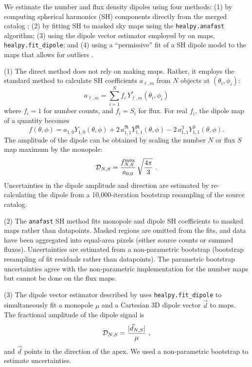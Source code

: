 \documentclass[twocolumn]{aastex63}
\begin{document}
We estimate the number and flux density dipoles using four methods:
(1) by computing spherical harmonics (SH) components directly from the merged catalog \citep[after][]{blake2002};
(2) by fitting SH to masked sky maps using the \texttt{healpy.anafast} algorithm;
(3) using the dipole vector estimator employed by \citet{secrest2021} on maps, \texttt{healpy.fit\_dipole}; and
(4) using a ``permissive'' fit of a SH dipole model to the maps that allows for outliers \citep{sivia2006,darling2018}.


(1) The direct method does not rely on making maps.  Rather, it employs the standard method to
calculate SH coefficients $a_{\ell,m}$ from $N$ objects at $(\theta_i,\phi_i)$:
\begin{equation}
  a_{\ell,m} = \sum_{i=1}^N f_i\, Y^*_{\ell,m}(\theta_i,\phi_i)
\end{equation}
where $f_i = 1$ for number counts, and $f_i = S_i$ for flux.  For real $f_i$, the dipole map of
a quantity becomes
\begin{equation}
  f(\theta,\phi) =   a_{1,0} Y_{1,0}(\theta,\phi) +2\, a_{1,1}^\Re Y_{1,1}^\Re(\theta,\phi)
                                                                       -2\, a_{1,1}^\Im Y_{1,1}^\Im(\theta,\phi).
\end{equation}
The amplitude of the dipole can be obtained by scaling the number $N$ or flux $S$ map maximum by the monopole:
\begin{equation}
  \mathcal{D}_{N,S} = {f_{N,S}^{\rm max} \over a_{0,0}}\, \sqrt{4\pi\over3}\ .
\end{equation}
Uncertainties in the dipole amplitude and direction are estimated by
re-calculating the dipole from a 10,000-iteration bootstrap resampling of the source catalog.


(2) The \texttt{anafast} SH method fits monopole and dipole SH coefficients to masked maps rather
than datapoints.  Masked regions are omitted from the fits, and data have been aggregated into equal-area
pixels (either source counts or summed fluxes).  Uncertainties are estimated from a non-parametric bootstrap (bootstrap
resampling of fit residuals rather than datapoints).
The parametric bootstrap uncertainties agree with the non-parametric implementation for the number maps but cannot
be done on the flux maps.

(3) The dipole vector estimator described by \citet{secrest2021} uses \texttt{healpy.fit\_dipole} to
simultaneously fit a monopole $\mu$ and a Cartesian 3D dipole vector $\vec{d}$ to maps.
The fractional amplitude of the dipole signal is 
\begin{equation}
  \mathcal{D}_{N,S} = {|\vec{d}_{N,S}|\over \mu}\ ,
\end{equation}
and $\vec{d}$ points in the direction of the apex.  
We used a non-parametric bootstrap to estimate uncertainties.
\end{document}
